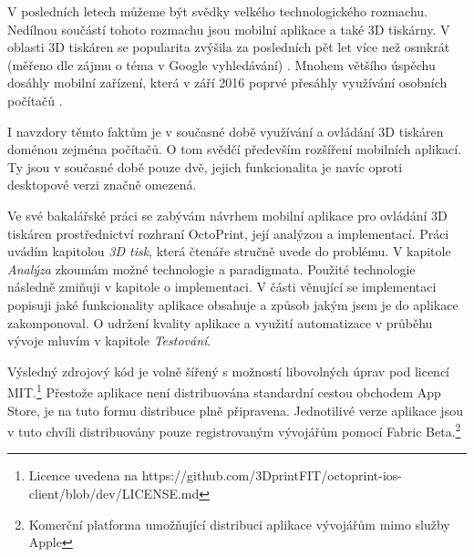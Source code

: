 V posledních letech můžeme být svědky velkého technologického rozmachu.
Nedílnou součástí tohoto rozmachu jsou mobilní aplikace a také 3D tiskárny.
V oblasti 3D tiskáren se popularita zvýšila za posledních pět let více než osmkrát (měřeno dle zájmu o téma v Google vyhledávání) \cite{3d-print-google-trends}.
Mnohem většího úspěchu dosáhly mobilní zařízení, která v září 2016 poprvé přesáhly využívání osobních počítačů \cite{mobile-devices-market-share}.

I navzdory těmto faktům je v současné době využívání a ovládání 3D tiskáren doménou zejména počítačů.
O tom svědčí především rozšíření mobilních aplikací.
Ty jsou v současné době pouze dvě, jejich funkcionalita je navíc oproti desktopové verzi značně omezená.

Ve své bakalářské práci se zabývám návrhem mobilní aplikace pro ovládání 3D tiskáren prostřednictví rozhraní OctoPrint, její analýzou a implementací.
Práci uvádím kapitolou \textit{3D tisk}, která čtenáře stručně uvede do problému.
V kapitole \textit{Analýza} zkoumám možné technologie a paradigmata.
Použité technologie následně zmiňuji v kapitole o implementaci.
V části věnující se implementaci popisuji jaké funkcionality aplikace obsahuje a způsob jakým jsem je do aplikace zakomponoval.
O udržení kvality aplikace a využití automatizace v průběhu vývoje mluvím v kapitole \textit{Testování}.

Výsledný zdrojový kód je volně šířený s možností libovolných úprav pod licencí MIT.\footnote{Licence uvedena na https://github.com/3DprintFIT/octoprint-ios-client/blob/dev/LICENSE.md}
Přestože aplikace není distribuována standardní cestou obchodem App Store, je na tuto formu distribuce plně připravena.
Jednotilivé verze aplikace jsou v tuto chvíli distribuovány pouze registrovaným vývojářům pomocí Fabric Beta.\footnote{Komerční platforma umožňující distribuci aplikace vývojářům mimo služby Apple}

